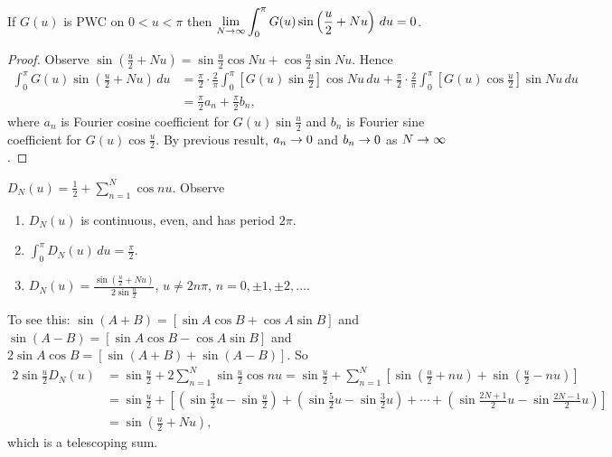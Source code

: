 \documentclass[]{article}
\begin{document}
\begin{lemma}
	 If $G(u)$ is PWC on $0<u<\pi$ then $ \displaystyle \lim_{N\rightarrow\infty} \int_0^\pi G(u) \sin\left(\frac{u}{2} + Nu\right) \, du =0$.
\end{lemma}
\begin{proof}
	Observe $\displaystyle \sin\left(\frac{u}{2}+Nu\right) = \sin{\frac{u}{2}}\cos{Nu}+\cos{\frac{u}{2}}\sin{Nu}$. Hence \begin{align*}\int_0^\pi G(u) \sin \left(\frac{u}{2} + Nu\right) \, du &= \frac{\pi}{2} \cdot \frac{2}{\pi} \int_0^\pi \left[ G(u) \sin{\frac{u}{2}} \right] \cos{Nu} \, du + \frac{\pi}{2} \cdot \frac{2}{\pi} \int_0^\pi \left[ G(u) \cos{\frac{u}{2}}\right] \sin{Nu} \, du \\ &=\frac{\pi}{2} a_n + \frac{\pi}{2} b_n, \end{align*} where $a_n$ is Fourier cosine coefficient for $G(u)\sin{\frac{u}{2}}$ and $b_n$ is Fourier sine coefficient for $G(u)\cos{\frac{u}{2}}$. By previous result, $a_n\rightarrow 0$ and $b_n\rightarrow 0$ as $N\rightarrow\infty$.
\end{proof}
\begin{definition}
	 $\displaystyle D_N(u) = \frac{1}{2} + \sum_{n=1}^N \cos{nu}$. Observe
	\begin{enumerate}
		\item $D_N(u)$ is continuous, even, and has period $2\pi$.
		\item $\int_0^\pi D_N(u) \, du = \frac{\pi}{2}$.
		\item $\displaystyle D_N(u) = \frac{\sin{\left(\frac{u}{2} + Nu\right)}}{2\sin{\frac{u}{2}}}$, $u\neq 2n\pi$, $n=0,\pm1,\pm2,\dots$.
	\end{enumerate}
	To see this: $\sin{(A+B)} = [\sin{A} \cos B + \cos A \sin B]$ and $\sin(A-B) = [\sin A \cos B - \cos A \sin B] $
	and $2\sin A \cos B = [\sin(A+B) + \sin(A-B)]$. So \begin{align*}
	2\sin{\frac{u}{2}} D_N(u) &= \sin{\frac{u}{2}} + 2 \sum_{n=1}^N \sin{\frac{u}{2}}\cos{nu} = \sin{\frac{u}{2}} + \sum_{n=1}^N \left[ \sin{\left(\frac{u}{2} + nu \right)} + \sin{\left(\frac{u}{2} - nu \right)} \right] \\ &= \sin{\frac{u}{2}} + \left[ \left( \sin{\frac{3}{2}u} - \sin{\frac{u}{2}} \right) + \left(\sin{\frac{5}{2}u}-\sin{\frac{3}{2}u} \right) + \cdots + \left( \sin{\frac{2N+1}{2}u} - \sin{\frac{2N-1}{2}u} \right) \right] \\ & = \sin{\left(\frac{u}{2}+Nu\right) },\end{align*}
	which is a telescoping sum.
\end{definition}
\end{document}
